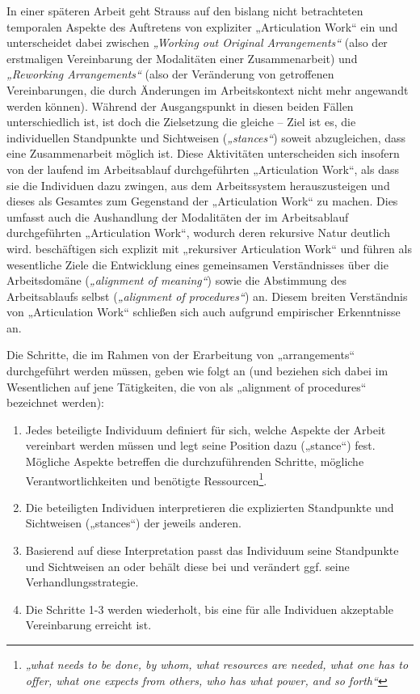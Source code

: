 In einer späteren Arbeit geht Strauss auf den bislang nicht betrachteten temporalen Aspekte des Auftretens von expliziter „Articulation Work“ ein \citep{Corbin93} und unterscheidet dabei zwischen \emph{„Working out Original Arrangements“} (also der erstmaligen Vereinbarung der Modalitäten einer Zusammenarbeit) und \emph{„Reworking Arrangements“} (also der Veränderung von getroffenen Vereinbarungen, die durch Änderungen im Arbeitskontext nicht mehr angewandt werden können). Während der Ausgangspunkt in diesen beiden Fällen unterschiedlich ist, ist doch die Zielsetzung die gleiche -- Ziel ist es, die individuellen Standpunkte und Sichtweisen (\emph{„stances“}) soweit abzugleichen, dass eine Zusammenarbeit möglich ist. Diese Aktivitäten unterscheiden sich insofern von der laufend im Arbeitsablauf durchgeführten „Articulation Work“, als dass sie die Individuen dazu zwingen, aus dem Arbeitssystem herauszusteigen und dieses als Gesamtes zum Gegenstand der „Articulation Work“ zu machen. Dies umfasst auch die Aushandlung der Modalitäten der im Arbeitsablauf durchgeführten „Articulation Work“, wodurch deren rekursive Natur \citep{Star99} deutlich wird. \citet{Sarini02} beschäftigen sich explizit mit „rekursiver Articulation Work“ und führen als wesentliche Ziele die Entwicklung eines gemeinsamen Verständnisses über die Arbeitsdomäne (\emph{„alignment of meaning“}) sowie die Abstimmung des Arbeitsablaufs selbst (\emph{„alignment of procedures“}) an. Diesem breiten Verständnis von „Articulation Work“ schließen sich auch \citet{Baker07} aufgrund empirischer Erkenntnisse an.

\label{steps:corbin} Die Schritte, die im Rahmen von der Erarbeitung von „arrangements“ durchgeführt werden müssen, geben \citet{Corbin93} wie folgt an (und beziehen sich dabei im Wesentlichen auf jene Tätigkeiten, die von \citet{Sarini02} als „alignment of procedures“ bezeichnet werden):
\begin{enumerate}
	\item Jedes beteiligte Individuum definiert für sich, welche Aspekte der Arbeit vereinbart werden müssen und legt seine Position dazu („stance“) fest. Mögliche Aspekte betreffen die durchzuführenden Schritte, mögliche Verantwortlichkeiten und benötigte Ressourcen\footnote{\emph{„what needs to be done, by whom, what resources are needed, what one has to offer, what one expects from others, who has what power, and so forth“}\citep[][S. 76]{Corbin93}}. 
	\item Die beteiligten Individuen interpretieren die explizierten Standpunkte und Sichtweisen („stances“) der jeweils anderen. 
	\item Basierend auf diese Interpretation passt das Individuum seine Standpunkte und Sichtweisen an oder behält diese bei und verändert ggf. seine Verhandlungsstrategie.
	\item Die Schritte 1-3 werden wiederholt, bis eine für alle Individuen akzeptable Vereinbarung erreicht ist.
\end{enumerate}

